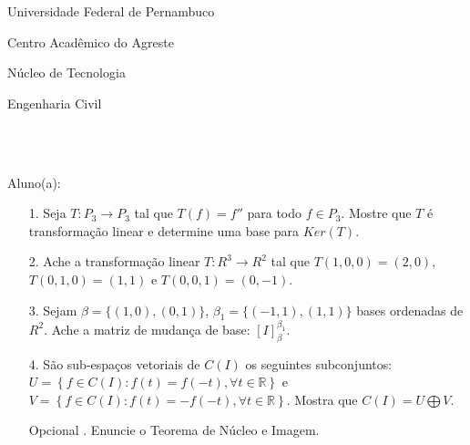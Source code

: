 \documentclass[oneside,a4paper,12pt]{article}
\newcommand{\universidade}{Universidade Federal de Pernambuco}
\newcommand{\centro}{Centro Acadêmico do Agreste}
\newcommand{\departamento}{Núcleo de Tecnologia}
\newcommand{\curso}{Engenharia Civil}
\begin{document}
	\pagestyle{empty}
	
	\begin{center}
	 	\vspace{0pt}
	 	
		\universidade
		\par
		\centro
		\par
		\departamento
		\par
		\curso
		\par
		\vspace{08pt}
		\\
		 \\
	\end{center}
	
	
	\begin{flushleft}
		Aluno(a):
	\end{flushleft}
	
\begin{itemize}
\item[1.] Seja $T:P_{3}\longrightarrow P_{3} $ tal que $T(f)=f''$ para todo $f\in P_{3}$. Mostre que $T$ é transformação linear e determine uma base para $Ker(T)$.
\end{itemize}
\begin{itemize}
\item[2.] Ache a transformação linear $T:R^{3}\longrightarrow R^{2}$ tal que $T(1,0,0)=(2,0)$, $T(0,1,0)=(1,1)$ e $T(0,0,1)=(0,-1)$.
 \end{itemize}
 \begin{itemize}
\item [3.] Sejam $\beta=\{(1,0),(0,1)\}$, $\beta_{1}=\{(-1,1), (1,1)\}$ bases ordenadas de $R^{2}$. Ache a matriz de mudança de base: $[I]_{\beta}^{\beta_{1}}$.
\end{itemize}
\begin{itemize}
\item[4.]São sub-espaços vetoriais de $C(I)$ os seguintes subconjuntos: $U=\left\lbrace f\in C(I): f(t)=f(-t), \forall t\in \mathbb{R}\right\rbrace $ e $V= \left\lbrace f\in C(I): f(t)=-f(-t),\forall t\in \mathbb{R}\right\rbrace $. Mostra que $C(I)=U\bigoplus V$.
\end{itemize}
\begin{itemize}
	\item[Opcional]. Enuncie o Teorema de Núcleo e Imagem.
	
\end{itemize}
\end{document}
